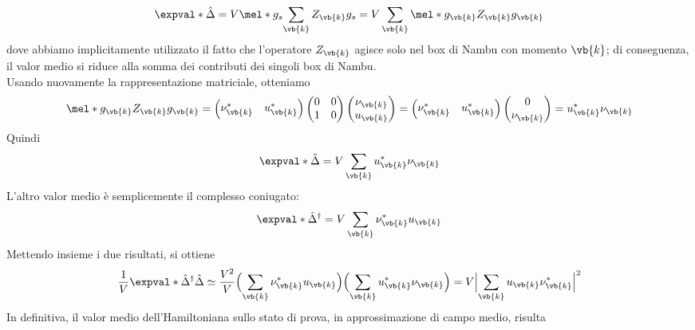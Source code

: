 \begin{equation*}
   \expval*{\hat{\Delta}}
   =V \mel*{g_s}{\sum_{\vb{k}} Z_{\vb{k}}}{g_s}
   =V \sum_{\vb{k}} \mel*{g_{\vb{k}}}{Z_{\vb{k}}}{g_{\vb{k}}}
\end{equation*}
dove abbiamo implicitamente utilizzato il fatto che l'operatore $Z_{\vb{k}}$ agisce solo nel box di Nambu con momento $\vb{k}$; di conseguenza, il valor medio si riduce alla somma dei contributi dei singoli box di Nambu.\\
Usando nuovamente la rappresentazione matriciale, otteniamo
\begin{equation*}
   \mel*{g_{\vb{k}}}{Z_{\vb{k}}}{g_{\vb{k}}}
   =
   \begin{pmatrix}
      \nu^*_{\vb{k}} & u^*_{\vb{k}}
   \end{pmatrix}
   \begin{pmatrix}
      0 & 0 \\
      1 & 0
   \end{pmatrix}
   \begin{pmatrix}
      \nu_{\vb{k}} \\
      u_{\vb{k}}
   \end{pmatrix}
   =
   \begin{pmatrix}
      \nu^*_{\vb{k}} & u^*_{\vb{k}}
   \end{pmatrix}
   \begin{pmatrix}
      0\\
      \nu_{\vb{k}}
   \end{pmatrix}
   =u^*_{\vb{k}} \nu_{\vb{k}}
\end{equation*}
Quindi
\begin{equation*}
   \expval*{\hat{\Delta}}
   =V \sum_{\vb{k}} u^*_{\vb{k}} \nu_{\vb{k}}
\end{equation*}
L'altro valor medio è semplicemente il complesso coniugato:
\begin{equation*}
   \expval*{\hat{\Delta}^{\dag}}
   =V \sum_{\vb{k}} \nu^*_{\vb{k}} u_{\vb{k}}
\end{equation*}
Mettendo insieme i due risultati, si ottiene
\begin{equation*}
   \frac{1}{V} \expval*{\hat{\Delta}^{\dag} \hat{\Delta}}
   \simeq \frac{V^2}{V} \Bigl( \sum_{\vb{k}} \nu^*_{\vb{k}} u_{\vb{k}} \Bigr) \Bigl( \sum_{\vb{k}} u^*_{\vb{k}} \nu_{\vb{k}} \Bigr)
   = V \Bigl| \sum_{\vb{k}} u_{\vb{k}} \nu^*_{\vb{k}} \Bigr|^2
\end{equation*}
In definitiva, il valor medio dell'Hamiltoniana sullo stato di prova, in approssimazione di campo medio, risulta
